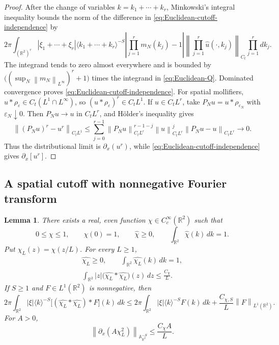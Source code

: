 \documentclass[12pt,reqno,letterpaper]{amsart}
\numberwithin{equation}{section}
\newtheorem{lemma}[theorem]{Lemma}
\theoremstyle{definition}
\newcommand{\R}{\mathbb R}
\newcommand{\A}{\mathbb A}
\newcommand{\eps}{\varepsilon}
\newcommand{\norm}[1]{\left\lVert #1\right\rVert}
\newcommand{\abs}[1]{\left\lvert #1\right\rvert}
\begin{document}
\begin{proof}
After the change of variables
$k=k_1+\cdots+k_r$, Minkowski's integral inequality bounds the norm of
the difference in \eqref{eq:Euclidean-cutoff-independence} by
\[
 2\pi\int_{(\R^2)^r}\abs{\xi_1+\cdots+\xi_r}
 \langle k_1+\cdots+k_r\rangle^{-S}
 \abs{\prod_{j=1}^rm_N(k_j)-1}
 \norm{\prod_{j=1}^r\widehat u(\cdot,k_j)}_{C_t}
 \prod_{j=1}^rdk_j.
\]
The integrand tends to zero almost everywhere and is bounded by
$\bigl((\sup_N\norm{m_N}_{L^\infty})^r+1\bigr)$ times the integrand in
\eqref{eq:Euclidean-Q}.  Dominated convergence proves
\eqref{eq:Euclidean-cutoff-independence}.  For spatial mollifiers,
$u*\rho_\eps\in C_t(L^1\cap L^\infty)$, so
$(u*\rho_\eps)^r\in C_tL^1$.  If $u\in C_tL^r$, take
$P_Nu=u*\rho_{\eps_N}$ with $\eps_N\downarrow0$.  Then $P_Nu\to u$ in
$C_tL^r$, and H\"older's inequality gives
\[
 \norm{(P_Nu)^r-u^r}_{C_tL^1}
 \leq\sum_{j=0}^{r-1}
  \norm{P_Nu}_{C_tL^r}^{r-1-j}\norm u_{C_tL^r}^j
  \norm{P_Nu-u}_{C_tL^r}\longrightarrow0.
\]
Thus the distributional limit is $\partial_x(u^r)$, while
\eqref{eq:Euclidean-cutoff-independence} gives $\partial_x[u^r]$.
\end{proof}

\subsection{A spatial cutoff with nonnegative Fourier transform}

\begin{lemma}
\label{lem:Euclidean-positive-approximation}
There exists a real, even function $\chi\in C_c^\infty(\R^2)$ such that
\begin{equation*}
   0\leq\chi\leq1,
   \qquad \chi(0)=1,
   \qquad \widehat\chi\geq0,
   \qquad \int_{\R^2}\widehat\chi(k)\,dk=1.
\end{equation*}
Put $\chi_L(z)=\chi(z/L)$.  For every $L\geq1$,
\begin{equation}\label{eq:Euclidean-spatial-cutoff-moment}
\begin{gathered}
   \widehat{\chi_L}\geq0,
   \qquad
   \int_{\R^2}\widehat{\chi_L}(k)\,dk=1,\\
   \int_{\R^2}\abs z
      \bigl(\widehat{\chi_L}*\widehat{\chi_L}\bigr)(z)\,dz
      \leq\frac{C_\chi}{L}.
\end{gathered}
\end{equation}
If $S\geq1$ and $F\in L^1(\R^2)$ is nonnegative, then
\begin{equation*}
 2\pi\int_{\R^2}\abs\xi\langle k\rangle^{-S}
       \bigl[(\widehat{\chi_L}*\widehat{\chi_L})*F\bigr](k)\,dk
 \leq
  2\pi\int_{\R^2}\abs\xi\langle k\rangle^{-S}F(k)\,dk
  +\frac{C_{\chi,S}}{L}\norm F_{L^1(\R^2)}.
\end{equation*}
For $A>0$,
\begin{equation}\label{eq:localized-constant-scaling}
    \norm{\partial_x(A\chi_L^2)}_{\A^{-S}_{\R^2}}
      \leq \frac{C_\chi A}{L}.
\end{equation}
\end{lemma}
\end{document}
